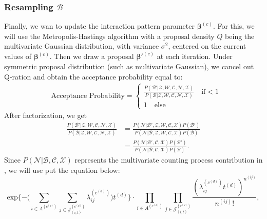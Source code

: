 \documentclass[a4paper]{article}
\begin{document}
\subsubsection{Resampling $\mathcal{B}$}
Finally, we wan to update the interaction pattern parameter $\boldsymbol{\beta}^{(c)}$. For this, we will use the Metropolis-Hastings algorithm with a proposal density $Q$ being the multivariate Gaussian distribution, with variance $\sigma^2$, centered on the current values of $\boldsymbol{\beta}^{(c)}$. Then we draw a proposal $\boldsymbol{\beta}'^{(c)}$ at each iteration. Under symmetric proposal distribution (such as multivariate Gaussian), we cancel out Q-ration and obtain the acceptance probability equal to:
\begin{equation}
\begin{split}
& \mbox{Acceptance Probability}=
\begin{cases}  \frac{P(\mathcal{B'}|\mathcal{Z}, \mathcal{W}, \mathcal{C}, \mathcal{N}, \mathcal{X})}{P(\mathcal{B}|\mathcal{Z}, \mathcal{W}, \mathcal{C}, \mathcal{N}, \mathcal{X})}\quad\text{if}  <1\\
1 \quad \text{else}
\end{cases}
\end{split}
\end{equation}
After factorization, we get
\begin{equation}
\begin{aligned}
\frac{P(\mathcal{B'}|\mathcal{Z}, \mathcal{W}, \mathcal{C}, \mathcal{N}, \mathcal{X})}{P(\mathcal{B}|\mathcal{Z}, \mathcal{W}, \mathcal{C}, \mathcal{N}, \mathcal{X})} &=\frac{P(\mathcal{N}|\mathcal{B'}, \mathcal{Z}, \mathcal{W}, \mathcal{C}, \mathcal{X})P(\mathcal{B'})}{P(\mathcal{N}|\mathcal{B}, \mathcal{Z}, \mathcal{W}, \mathcal{C}, \mathcal{X})P(\mathcal{B})}\\&=\frac{P(\mathcal{N}|\mathcal{B'}, \mathcal{C}, \mathcal{X})P(\mathcal{B'})}{P(\mathcal{N}|\mathcal{B}, \mathcal{C}, \mathcal{X})P(\mathcal{B})}.
\end{aligned}
\end{equation}
Since $P(\mathcal{N}|\mathcal{B}, \mathcal{C}, \mathcal{X})$ represents the multivariate counting process contribution in \cite{zocher2006multivariate}, we will use put the equation below: \begin{equation}
\mbox{exp}\Big\{{-\big(\sum\limits_{i \in A^{(c^{(d)})}}\sum\limits_{j\in \mathcal{J}^{(c^{(d)})}_{(i, t)}}\lambda_{ij}^{(c^{(d)})}\big)t^{(d)}}\Big\}\cdot \prod_{i \in A^{(c^{(d)})}}\prod_{j\in \mathcal{J}^{(c^{(d)})}_{(i, t)}}\frac{(\lambda_{ij}^{(c^{(d)})}t^{(d)})^{n^{(ij)}}}{n^{(ij)}!},
\end{equation}
\end{document}
